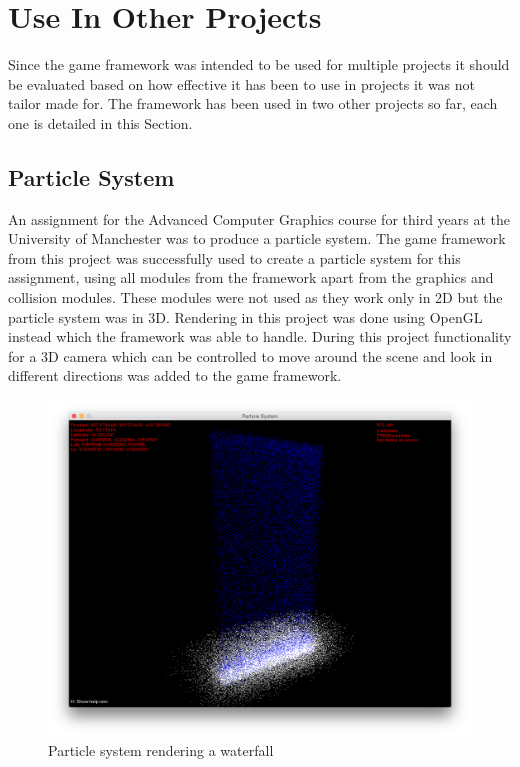 \documentclass[]{report}
\begin{document}
	\section{Use In Other Projects}
	Since the game framework was intended to be used for multiple projects it should be evaluated based on how effective it has been to use in projects it was not tailor made for. The framework has been used in two other projects so far, each one is detailed in this Section.
		\subsection{Particle System}
		An assignment for the Advanced Computer Graphics course for third years at the University of Manchester was to produce a particle system. The game framework from this project was successfully used to create a particle system for this assignment, using all modules from the framework apart from the graphics and collision modules. These modules were not used as they work only in 2D but the particle system was in 3D. Rendering in this project was done using OpenGL instead which the framework was able to handle. During this project functionality for a 3D camera which can be controlled to move around the scene and look in different directions was added to the game framework.
		
		\begin{figure}[H]
			\centerline{\includegraphics[width=1.5\textwidth]{particlesystem}}
			\caption{Particle system rendering a waterfall}
			\label{particlesystem}
		\end{figure}
		
\end{document}
